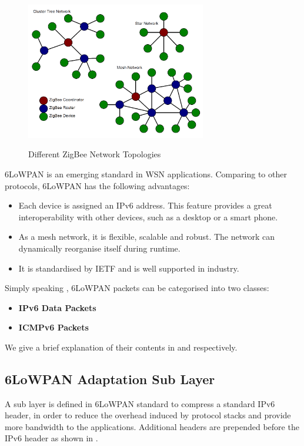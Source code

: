 \begin{figure}[h!]
	\centering
	{
		\includegraphics[width=0.7\textwidth,]{fig/ZigBeeTopologies.png}
	}
	\caption{Different ZigBee Network Topologies} \label{fig: ZigBee Topologies}
\end{figure}

6LoWPAN is an emerging standard in WSN applications. Comparing to other protocols, 6LoWPAN has the following advantages: 
\begin{itemize}
	\item Each device is assigned an IPv6 address. This feature provides a great interoperability with other devices, such as a desktop or a smart phone.
	\item As a mesh network, it is flexible, scalable and robust. The network can dynamically reorganise itself during runtime.
	\item It is standardised by IETF and is well supported in industry.
\end{itemize}

Simply speaking , 6LoWPAN packets can be categorised into two classes:
\begin{itemize}
	\item \textbf{IPv6 Data Packets}
	\item \textbf{ICMPv6 Packets}
\end{itemize}
We give a brief explanation of their contents in  and  respectively.
\subsection{6LoWPAN Adaptation Sub Layer} \label{Subsec:6LoWPAN Adaptation Sub Layer}
A sub layer is defined in 6LoWPAN standard\cite{rfc4944} to compress a standard IPv6 header, in order to reduce the overhead induced by protocol stacks and provide more bandwidth to the applications. Additional headers are prepended before the IPv6 header as shown in . 

